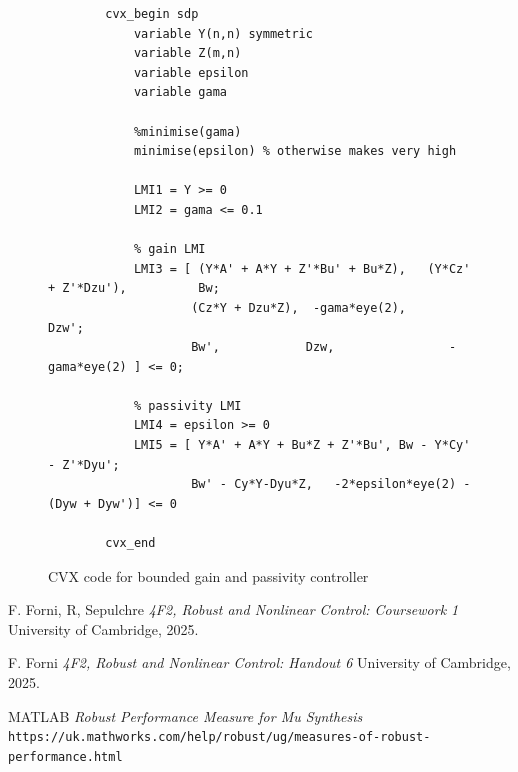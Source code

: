 \documentclass{article}
\begin{document}
\begin{figure}[H]
    \centering
    \begin{lstlisting}
        cvx_begin sdp
            variable Y(n,n) symmetric
            variable Z(m,n)
            variable epsilon
            variable gama
            
            %minimise(gama)
            minimise(epsilon) % otherwise makes very high

            LMI1 = Y >= 0
            LMI2 = gama <= 0.1
            
            % gain LMI
            LMI3 = [ (Y*A' + A*Y + Z'*Bu' + Bu*Z),   (Y*Cz' + Z'*Dzu'),          Bw;
                    (Cz*Y + Dzu*Z),  -gama*eye(2),      Dzw';
                    Bw',            Dzw,                -gama*eye(2) ] <= 0;
            
            % passivity LMI
            LMI4 = epsilon >= 0
            LMI5 = [ Y*A' + A*Y + Bu*Z + Z'*Bu', Bw - Y*Cy' - Z'*Dyu';
                    Bw' - Cy*Y-Dyu*Z,   -2*epsilon*eye(2) - (Dyw + Dyw')] <= 0
                
        cvx_end
    \end{lstlisting}
    \caption{CVX code for bounded gain and passivity controller}
    \label{fig:bounded_passive_lmi}
\end{figure}

\begin{thebibliography}{9}

    
      F. Forni, R, Sepulchre
      \emph{4F2, Robust and Nonlinear Control: Coursework 1}
      University of Cambridge,
      2025.

      F. Forni
      \emph{4F2, Robust and Nonlinear Control: Handout 6}
      University of Cambridge,
      2025.
    
      MATLAB
      \emph{Robust Performance Measure for Mu Synthesis}
      \texttt{https://uk.mathworks.com/help/robust/ug/measures-of-robust-performance.html}

    
\end{thebibliography}
\end{document}
